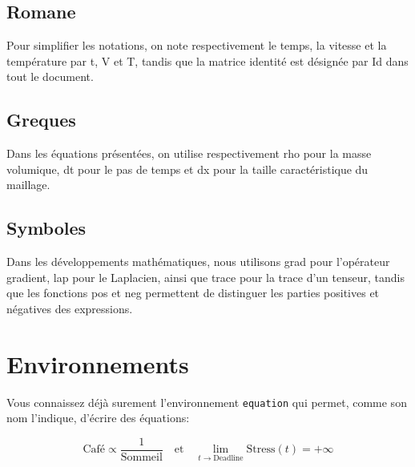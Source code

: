 \subsection{Romane}\label{Annexe_A:Romane}

Pour simplifier les notations, on note respectivement le temps, la vitesse et la température par \gls{t}, \gls{V} et \gls{T}, tandis que la matrice identité est désignée par \gls{Id} dans tout le document.

\subsection{Greques}\label{Annexe_A:Greques}

Dans les équations présentées, on utilise respectivement \gls{rho} pour la masse volumique, \gls{dt} pour le pas de temps et \gls{dx} pour la taille caractéristique du maillage.

\subsection{Symboles}\label{Annexe_A:Symboles}

Dans les développements mathématiques, nous utilisons \gls{grad} pour l'opérateur gradient, \gls{lap} pour le Laplacien, ainsi que \gls{trace} pour la trace d'un tenseur, tandis que les fonctions \gls{pos} et \gls{neg} permettent de distinguer les parties positives et négatives des expressions.

\section{Environnements}\label{Annexe_A:Environnements}

Vous connaissez déjà surement l'environnement \texttt{equation} qui permet, comme son nom l'indique, d'écrire des équations:

\begin{equation}
    \text{Café} \propto \frac{1}{\text{Sommeil}} \quad \text{et} \quad
    \lim_{t \to \text{Deadline}} \text{Stress}(t) = +\infty
\end{equation}

